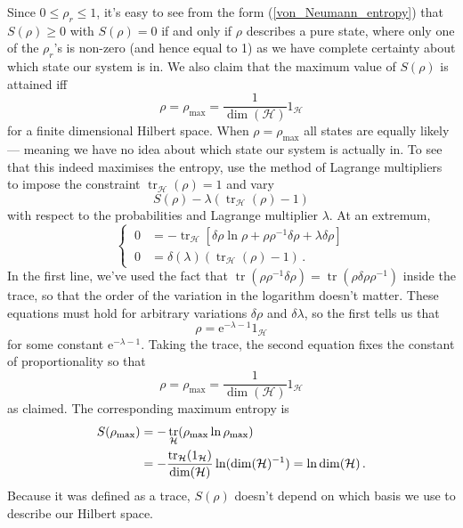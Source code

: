 \documentclass{article}
\theoremstyle{plain}\theoremheaderfont{\normalfont\itshape}\theorembodyfont{\rmfamily}\theoremseparator{.}\newtheorem*{rem}{Remark}\newtheorem*{ex}{Example}\newtheorem*{proof}{Proof}\newtheorem*{altp}{Alternative proof}
\theoremstyle{plain}\theoremheaderfont{\normalfont\bfseries}\theorembodyfont{\rmfamily}\theoremseparator{.}\newtheorem{thm}{Theorem}[section]\newtheorem{lem}[thm]{Lemma}\newtheorem{prop}[thm]{Proposition}\newtheorem*{cor}{Corollary}\newtheorem{defn}[thm]{Definition}\newtheorem{clm}[thm]{Claim}\newtheorem{clminproof}{Claim}
\theoremstyle{break}\theoremheaderfont{\normalfont\itshape}\theorembodyfont{\rmfamily}\theoremseparator{.\medskip}\newtheorem*{proofskip}{Proof}\newtheorem*{exs}{Examples}\newtheorem*{rems}{Remarks}
\theoremstyle{break}\theoremheaderfont{\normalfont\bfseries}\theorembodyfont{\rmfamily}\theoremseparator{.\medskip}\newtheorem{lemskip}[thm]{Lemma}\newtheorem{defnskip}[thm]{Definition}\newtheorem{propskip}[thm]{Proposition}\newtheorem{thmskip}[thm]{Theorem}
\numberwithin{equation}{section}
\newcommand{\ee}{\mathrm{e}}
\newcommand{\hb}{\mathcal{H}}
\DeclareMathOperator{\tr}{tr}
\begin{document}
    Since \(0\le\rho_r\le 1\), it's easy to see from the form (\ref{von_Neumann_entropy}) that \(S(\rho)\ge 0\) with \(S(\rho)=0\) if and only if \(\rho\) describes a pure state, where only one of the \(\rho_r\)'s is non-zero (and hence equal to 1) as we have complete certainty about which state our system is in. We also claim that the maximum value of \(S(\rho)\) is attained iff
    \begin{equation}
        \rho=\rho_{\text{max}}=\frac{1}{\dim(\hb)}1_{\hb}
    \end{equation}
    for a finite dimensional Hilbert space. When \(\rho=\rho_{\text{max}}\) all states are equally likely --- meaning we have no idea about which state our system is actually in. To see that this indeed maximises the entropy, use the method of Lagrange multipliers to impose the constraint \(\tr_\hb(\rho)=1\) and vary
    \begin{equation}
        S(\rho)-\lambda(\tr_\hb(\rho)-1)
    \end{equation}
    with respect to the probabilities and Lagrange multiplier \(\lambda\). At an extremum,
    \begin{equation}
        \left\{\ \begin{aligned}
            0&=-\tr_\hb[\delta\rho\ln\rho+\rho\rho^{-1}\delta\rho+\lambda\delta\rho]\\
            0&=\delta(\lambda)(\tr_\hb(\rho)-1)\,.
        \end{aligned}\right.
    \end{equation}
    In the first line, we've used the fact that \(\tr(\rho\rho^{-1}\delta\rho)=\tr(\rho\delta\rho\rho^{-1})\) inside the trace, so that the order of the variation in the logarithm doesn't matter. These equations must hold for arbitrary variations \(\delta\rho\) and \(\delta\lambda\), so the first tells us that
    \begin{equation}
        \rho=\ee^{-\lambda-1}1_{\hb}
    \end{equation}
    for some constant \(\ee^{-\lambda-1}\). Taking the trace, the second equation fixes the constant of proportionality so that
    \begin{equation}
        \rho=\rho_{\text{max}}=\frac{1}{\dim(\hb)}1_{\hb}
    \end{equation}
    as claimed. The corresponding maximum entropy is
    \begin{align}
        S(\rho_{\text{max}})&=-\tr_{\hb}(\rho_{\text{max}}\ln\rho_{\text{max}})\notag\\
        &=-\frac{\tr_{\hb}(1_{\hb})}{\dim(\hb)}\ln(\dim(\hb)^{-1})=\ln\dim(\hb)\,.
    \end{align}
    Because it was defined as a trace, \(S(\rho)\) doesn't depend on which basis we use to describe our Hilbert space.
\end{document}
